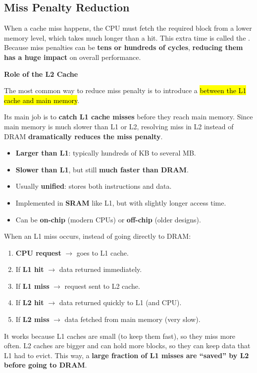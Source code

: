 \subsection{Miss Penalty Reduction}

When a cache miss happens, the CPU must fetch the required block from a lower memory level, which takes much longer than a hit. This extra time is called the . Because miss penalties can be \textbf{tens or hundreds of cycles}, \textbf{reducing them has a huge impact} on overall performance.

\highspace
\begin{flushleft}
    \textcolor{Green3}{\faIcon{\speedIcon} \textbf{Role of the L2 Cache}}
\end{flushleft}
The most common way to reduce miss penalty is to introduce a  \hl{between the L1 cache and main memory}.

\highspace
Its main job is to \textbf{catch L1 cache misses} before they reach main memory. Since main memory is much slower than L1 or L2, resolving miss in L2 instead of DRAM \textbf{dramatically reduces the miss penalty}.
\begin{itemize}
    \item[\textcolor{Green3}{\faIcon{warehouse}}] \textbf{Larger than L1}: typically hundreds of KB to several MB.
    \item[\textcolor{Red2}{\faIcon{walking}}] \textbf{Slower than L1}, but still \textbf{much faster than DRAM}.
    \item Usually \textbf{unified}: stores both instructions and data.
    \item Implemented in \textbf{SRAM} like L1, but with slightly longer access time.
    \item Can be \textbf{on-chip} (modern CPUs) or \textbf{off-chip} (older designs).
\end{itemize}
When an L1 miss occurs, instead of going directly to DRAM:
\begin{enumerate}
    \item \textbf{CPU request} $\rightarrow$ goes to L1 cache.
    \item If \textbf{L1 hit} $\rightarrow$ data returned immediately.
    \item If \textbf{L1 miss} $\rightarrow$ request sent to L2 cache.
    \item If \textbf{L2 hit} $\rightarrow$ data returned quickly to L1 (and CPU).
    \item If \textbf{L2 miss} $\rightarrow$ data fetched from main memory (very slow).
\end{enumerate}
It works because L1 caches are small (to keep them fast), so they miss more often. L2 caches are bigger and can hold more blocks, so they can keep data that L1 had to evict. This way, a \textbf{large fraction of L1 misses are ``saved'' by L2 before going to DRAM}.

